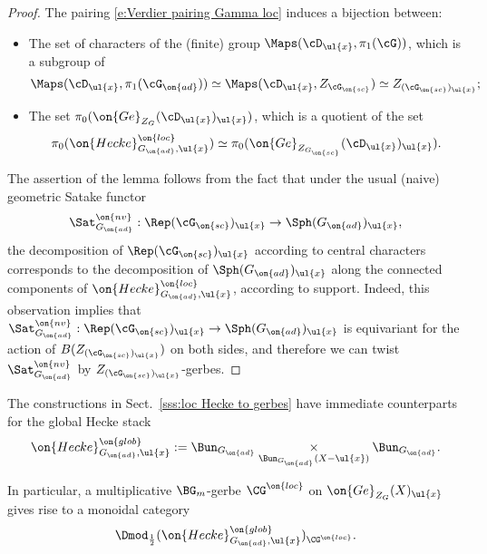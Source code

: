 \documentclass[9pt]{amsart}
\theoremstyle{remark}
\theoremstyle{definition}
\theoremstyle{remark}
\newcommand{\secref}[1]{Sect.~\ref{#1}}
\numberwithin{equation}{section}
\begin{document}
\begin{proof}

The pairing \eqref{e:Verdier pairing Gamma loc} induces a bijection between:

\begin{itemize}

\item The set of characters of the (finite) group $\Maps(\cD_{\ul{x}},\pi_1(\cG))$, which is a subgroup of 
$$\Maps(\cD_{\ul{x}},\pi_1(\cG_{\on{ad}}))\simeq \Maps(\cD_{\ul{x}},Z_{\cG_{\on{sc}}})\simeq Z_{(\cG_{\on{sc}})_{\ul{x}}};$$


\item The set $\pi_0(\on{Ge}_{Z_G}(\cD_{\ul{x}})_{\ul{x}})$, which is a quotient of the set
$$\pi_0(\on{Hecke}^{\on{loc}}_{G_{\on{ad}},\ul{x}})\simeq \pi_0(\on{Ge}_{Z_{G_{\on{sc}}}}(\cD_{\ul{x}})_{\ul{x}}).$$

\end{itemize}

The assertion of the lemma follows from the fact that under the usual (naive)
geometric Satake functor
$$\Sat^{\on{nv}}_{G_{\on{ad}}}:\Rep(\cG_{\on{sc}})_{\ul{x}}\to \Sph(G_{\on{ad}})_{\ul{x}},$$
the decomposition of $\Rep(\cG_{\on{sc}})_{\ul{x}}$ according to central characters corresponds to
the decomposition of $\Sph(G_{\on{ad}})_{\ul{x}}$ along the connected components of 
$\on{Hecke}^{\on{loc}}_{G_{\on{ad}},\ul{x}}$,
according to support. Indeed, this observation implies that 
$\Sat^{\on{nv}}_{G_{\on{ad}}}:\Rep(\cG_{\on{sc}})_{\ul{x}}\to \Sph(G_{\on{ad}})_{\ul{x}}$ is equivariant for the
action of $B(Z_{(\cG_{\on{sc}})_{\ul{x}}})$ on both sides, and therefore
we can twist $\Sat^{\on{nv}}_{G_{\on{ad}}}$ by 
$Z_{(\cG_{\on{sc}})_{\ul{x}}}$-gerbes.

\end{proof}


\sssec{}

The constructions in \secref{sss:loc Hecke to gerbes} have immediate counterparts for the global Hecke stack
$$\on{Hecke}^{\on{glob}}_{G_{\on{ad}},\ul{x}}:=
\Bun_{G_{\on{ad}}}\underset{\Bun_{G_{\on{ad}}}(X-\ul{x})}\times \Bun_{G_{\on{ad}}}.$$

In particular, a multiplicative $\BG_m$-gerbe $\CG^{\on{loc}}$ on $\on{Ge}_{Z_G}(X)_{\ul{x}}$ gives rise to a monoidal category
\begin{equation} \label{e:twisted glob Hecke}
\Dmod_{\frac{1}{2}}(\on{Hecke}^{\on{glob}}_{G_{\on{ad}},\ul{x}})_{\CG^{\on{loc}}}.
\end{equation}
\end{document}
